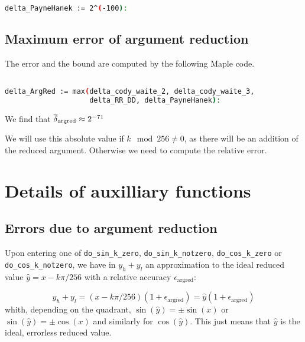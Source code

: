 \begin{lstlisting}[caption={Computing constants for Cody and Waite
    double-double}, firstnumber=1,
  language={sh}]% of course it's maple
%Skip a line here, I don't know why, otherwise latex eats the first line

delta_PayneHanek := 2^(-100):
\end{lstlisting}


\subsection{Maximum error of argument reduction }
The error and the bound are computed by the following Maple code.

\begin{lstlisting}[caption={Payne and Hanek error bound}, firstnumber=1,
  language={sh}]% of course it's maple
%Skip a line here, I don't know why, otherwise latex eats the first line

delta_ArgRed := max(delta_cody_waite_2, delta_cody_waite_3,
                    delta_RR_DD, delta_PayneHanek):
\end{lstlisting}

We find that ${\overline{\delta}}_{\mathrm{argred}}\approx 2^{-71}$

We will use this absolute value if $k\mod 256\ne 0$, as there will be
an addition of the reduced argument. Otherwise we need to compute the relative error.



\section{Details of auxilliary functions
  \label{trigo:auxilliary}}

\subsection{Errors due to argument reduction}
Upon entering one of \texttt{do\_sin\_k\_zero}, \texttt{do\_sin\_k\_notzero},
\texttt{do\_cos\_k\_zero} or \texttt{do\_cos\_k\_notzero}, we have in
$y_h+y_l$ an approximation to the ideal reduced value
$\hat{y}=x-k\pi/256$ with a relative accuracy $\epsilon_{\mathrm{argred}}$:

\begin{equation}
  y_h+y_l = (x-k\pi/256)(1+\epsilon_{\mathrm{argred}}) 
  = \hat{y}(1+\epsilon_{\mathrm{argred}})
  \label{eq:sinargrederror1}
\end{equation}
whith, depending on the quadrant, $\sin(\hat{y}) = \pm\sin(x)$ or
$\sin(\hat{y}) = \pm\cos(x)$ and similarly for $\cos(\hat{y})$. This
just means that $\hat{y}$ is the ideal, errorless reduced value.


